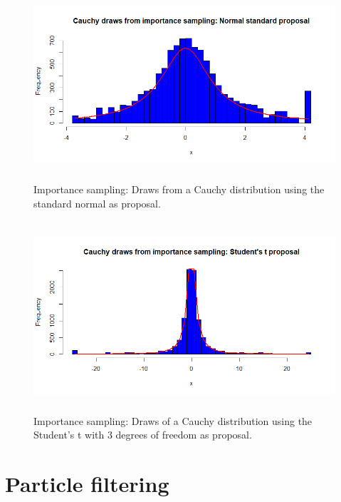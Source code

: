 \begin{figure}[!h]
	\includegraphics[width=340pt, height=200pt]{Chapters/chapter5/figures/IScauchyNormal.png}
	\caption[List of figure caption goes here]{Importance sampling: Draws from a Cauchy distribution using the standard normal as proposal.}\label{fig56}
\end{figure} 

\begin{figure}[!h]
	\includegraphics[width=340pt, height=200pt]{Chapters/chapter5/figures/IScauchyStudent.png}
	\caption[List of figure caption goes here]{Importance sampling: Draws of a Cauchy distribution using the Student's t with 3 degrees of freedom as proposal.}\label{fig57}
\end{figure}       

\section{Particle filtering}\label{sec53}

